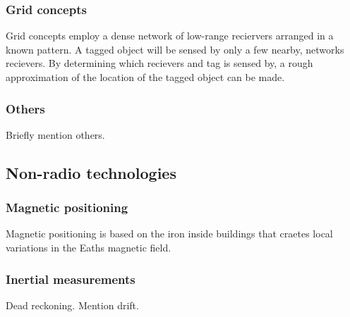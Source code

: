 \subsubsection{Grid concepts}
Grid concepts employ a dense network of low-range reciervers arranged in a known pattern. A tagged object will be sensed by only a few nearby, networks recievers. By determining which recievers and tag is sensed by, a rough approximation of the location of the tagged object can be made.

\subsubsection{Others}
Briefly mention others.

\subsection{Non-radio technologies}

\subsubsection{Magnetic positioning}
Magnetic positioning is based on the iron inside buildings that craetes local variations in the Eaths magnetic field.

\subsubsection{Inertial measurements}
Dead reckoning. Mention drift.

